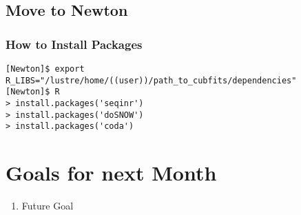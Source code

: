 \subsection{Move to Newton}

\subsubsection{How to Install Packages}

\begin{verbatim}
[Newton]$ export R_LIBS="/lustre/home/((user))/path_to_cubfits/dependencies"
[Newton]$ R
> install.packages('seqinr')
> install.packages('doSNOW')
> install.packages('coda')
\end{verbatim}



\section{Goals for next Month}
\begin{enumerate}
\item Future Goal
\end{enumerate}


